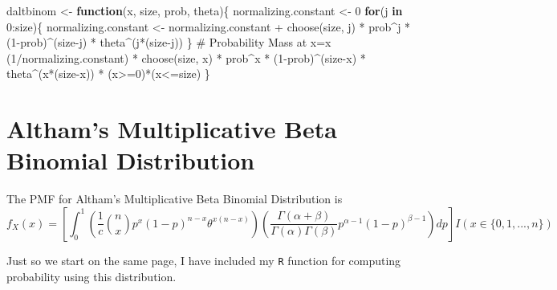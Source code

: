 \documentclass[
]{article}
\newenvironment{Shaded}{\begin{snugshade}}{\end{snugshade}}
\newcommand{\CommentTok}[1]{\textcolor[rgb]{0.37,0.37,0.37}{#1}}
\newcommand{\ControlFlowTok}[1]{\textcolor[rgb]{0.00,0.23,0.31}{\textbf{#1}}}
\newcommand{\DecValTok}[1]{\textcolor[rgb]{0.68,0.00,0.00}{#1}}
\newcommand{\FunctionTok}[1]{\textcolor[rgb]{0.28,0.35,0.67}{#1}}
\newcommand{\NormalTok}[1]{\textcolor[rgb]{0.00,0.23,0.31}{#1}}
\newcommand{\OtherTok}[1]{\textcolor[rgb]{0.00,0.23,0.31}{#1}}
\newcommand{\SpecialCharTok}[1]{\textcolor[rgb]{0.37,0.37,0.37}{#1}}
\begin{document}
\begin{Shaded}
\begin{Highlighting}[numbers=left,,]
\NormalTok{daltbinom }\OtherTok{\textless{}{-}} \ControlFlowTok{function}\NormalTok{(x, size, prob, theta)\{}
\NormalTok{  normalizing.constant }\OtherTok{\textless{}{-}} \DecValTok{0}
  \ControlFlowTok{for}\NormalTok{(j }\ControlFlowTok{in} \DecValTok{0}\SpecialCharTok{:}\NormalTok{size)\{}
\NormalTok{    normalizing.constant }\OtherTok{\textless{}{-}}\NormalTok{ normalizing.constant }\SpecialCharTok{+} 
      \FunctionTok{choose}\NormalTok{(size, j) }\SpecialCharTok{*}\NormalTok{ prob}\SpecialCharTok{\^{}}\NormalTok{j }\SpecialCharTok{*}\NormalTok{ (}\DecValTok{1}\SpecialCharTok{{-}}\NormalTok{prob)}\SpecialCharTok{\^{}}\NormalTok{(size}\SpecialCharTok{{-}}\NormalTok{j) }\SpecialCharTok{*}\NormalTok{ theta}\SpecialCharTok{\^{}}\NormalTok{(j}\SpecialCharTok{*}\NormalTok{(size}\SpecialCharTok{{-}}\NormalTok{j))}
\NormalTok{  \}}
  \CommentTok{\# Probability Mass at x=x}
\NormalTok{  (}\DecValTok{1}\SpecialCharTok{/}\NormalTok{normalizing.constant) }\SpecialCharTok{*}
    \FunctionTok{choose}\NormalTok{(size, x) }\SpecialCharTok{*}\NormalTok{ prob}\SpecialCharTok{\^{}}\NormalTok{x }\SpecialCharTok{*}\NormalTok{ (}\DecValTok{1}\SpecialCharTok{{-}}\NormalTok{prob)}\SpecialCharTok{\^{}}\NormalTok{(size}\SpecialCharTok{{-}}\NormalTok{x) }\SpecialCharTok{*}\NormalTok{ theta}\SpecialCharTok{\^{}}\NormalTok{(x}\SpecialCharTok{*}\NormalTok{(size}\SpecialCharTok{{-}}\NormalTok{x)) }\SpecialCharTok{*}
\NormalTok{      (x}\SpecialCharTok{\textgreater{}=}\DecValTok{0}\NormalTok{)}\SpecialCharTok{*}\NormalTok{(x}\SpecialCharTok{\textless{}=}\NormalTok{size)}
\NormalTok{\}}
\end{Highlighting}
\end{Shaded}

\normalsize

\section{Altham's Multiplicative Beta Binomial
Distribution}\label{althams-multiplicative-beta-binomial-distribution}

The PMF for Altham's Multiplicative Beta Binomial Distribution is
\[f_X(x) = \left[\int_{0}^1 \left(\frac{1}{c} {n \choose x} p^x (1-p)^{n-x} \theta^{x(n-x)}\right)\left(\frac{\Gamma(\alpha+\beta)}{\Gamma(\alpha)\Gamma(\beta)} p^{\alpha-1}(1-p)^{\beta-1}\right) dp\right]I(x \in \{0, 1, ..., n\})\]

Just so we start on the same page, I have included my \texttt{R}
function for computing probability using this distribution.
\end{document}
